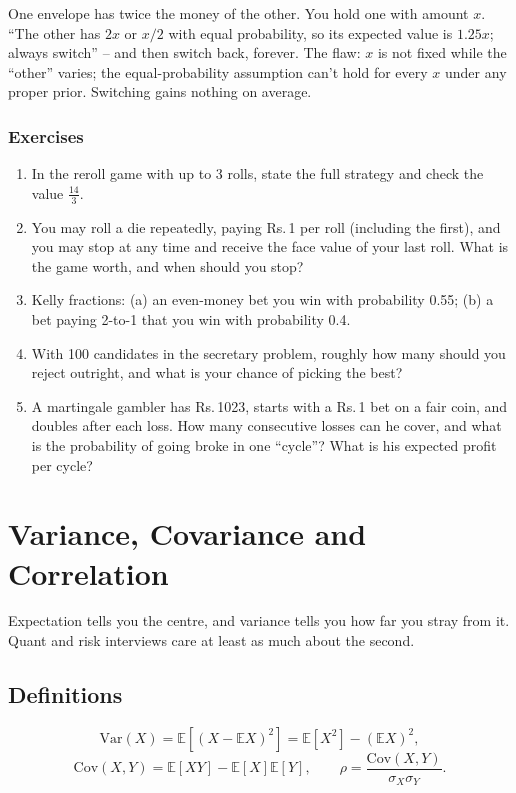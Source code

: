 \documentclass[11pt,a4paper,openany]{report}
\newenvironment{exercises}{\subsection*{Exercises \thechapter}\begin{enumerate}[label=\textbf{\thechapter.\arabic*},leftmargin=3.2em]}{\end{enumerate}}
\newcommand{\Rs}{Rs.\,}
\newcommand{\E}{\mathbb{E}}
\begin{document}
\begin{trap}
One envelope has twice the money of the other. You hold one with amount $x$. ``The other has $2x$ or $x/2$ with equal probability, so its expected value is $1.25x$; always switch'' -- and then switch back, forever. The flaw: $x$ is not fixed while the ``other'' varies; the equal-probability assumption can't hold for every $x$ under any proper prior. Switching gains nothing on average.
\end{trap}

\begin{exercises}
\item In the reroll game with up to 3 rolls, state the full strategy and check the value $\frac{14}3$.
\item You may roll a die repeatedly, paying \Rs1 per roll (including the first), and you may stop at any time and receive the face value of your last roll. What is the game worth, and when should you stop?
\item Kelly fractions: (a) an even-money bet you win with probability 0.55; (b) a bet paying 2-to-1 that you win with probability 0.4.
\item With 100 candidates in the secretary problem, roughly how many should you reject outright, and what is your chance of picking the best?
\item A martingale gambler has \Rs1023, starts with a \Rs1 bet on a fair coin, and doubles after each loss. How many consecutive losses can he cover, and what is the probability of going broke in one ``cycle''? What is his expected profit per cycle?
\end{exercises}

\chapter{Variance, Covariance and Correlation}\label{ch:var}

Expectation tells you the centre, and variance tells you how far you stray from it. Quant and risk interviews care at least as much about the second.

\section{Definitions}
\[\text{Var}(X)=\E[(X-\E X)^2]=\E[X^2]-(\E X)^2,\]
\[\text{Cov}(X,Y)=\E[XY]-\E[X]\E[Y],\qquad\rho=\frac{\text{Cov}(X,Y)}{\sigma_X\sigma_Y}.\]
\end{document}
